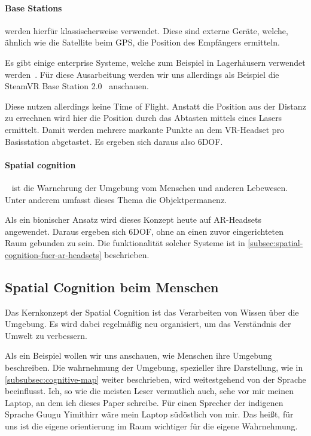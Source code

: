        \paragraph{Base Stations}\label{par:base-stations} werden hierfür klassischerweise verwendet.
            Diese sind externe Geräte, welche, ähnlich wie die Satellite beim GPS, die Position des Empfängers ermitteln.

            Es gibt einige enterprise Systeme, welche zum Beispiel in Lagerhäusern verwendet werden~\autocite{wikipedia-contributors-2023E}.
            Für diese Ausarbeitung werden wir uns allerdings als Beispiel die SteamVR Base Station 2.0~\autocite{valve-corporation-no-date} anschauen.

            Diese nutzen allerdings keine Time of Flight.
            Anstatt die Position aus der Distanz zu errechnen wird hier die Position durch das Abtasten mittels eines Lasers ermittelt.
            Damit werden mehrere markante Punkte an dem VR-Headset pro Basisstation abgetastet.
            Es ergeben sich daraus also 6DOF\@.

        \paragraph{Spatial cognition}~\autocite{wikipedia-contributors-2023F} ist die Warnehrung der Umgebung vom Menschen und anderen Lebewesen.
            Unter anderem umfasst dieses Thema die Objektpermanenz.

            Als ein bionischer Ansatz wird dieses Konzept heute auf AR-Headsets angewendet.
            Daraus ergeben sich 6DOF, ohne an einen zuvor eingerichteten Raum gebunden zu sein.
            Die funktionalität solcher Systeme ist in \autoref{subsec:spatial-cognition-fuer-ar-headsets} beschrieben.

\subsection{Spatial Cognition beim Menschen}\label{subsec:spatial-cognition-beim-menschen}
    Das Kernkonzept der Spatial Cognition ist das Verarbeiten von Wissen über die Umgebung. \autocite{wikipedia-contributors-2023F}
    Es wird dabei regelmäßig neu organisiert, um das Verständnis der Umwelt zu verbessern.

    Als ein Beispiel wollen wir uns anschauen, wie Menschen ihre Umgebung beschreiben.
    Die wahrnehmung der Umgebung, spezieller ihre Darstellung, wie in \autoref{subsubsec:cognitive-map} weiter beschrieben, wird weitestgehend von der Sprache beeinflusst. \autocite{haviland-1998}
    Ich, so wie die meisten Leser vermutlich auch, sehe vor mir meinen Laptop, an dem ich dieses Paper schreibe.
    Für einen Sprecher der indigenen Sprache Guugu Yimithirr wäre mein Laptop südöstlich von mir.
    Das heißt, für uns ist die eigene orientierung im Raum wichtiger für die eigene Wahrnehmung.

